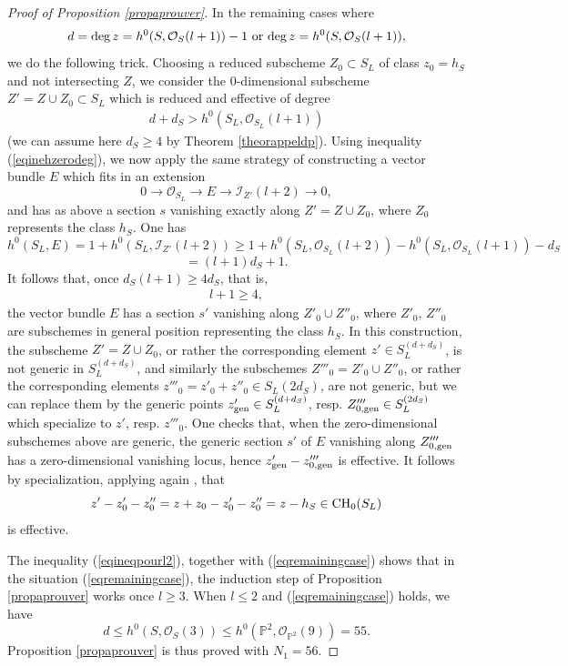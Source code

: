 \documentclass[10pt]{article}
\begin{document}
\begin{proof}[Proof of Proposition \ref{propaprouver}]
 In the remaining cases where
\begin{eqnarray}\label{eqremainingcase}  d={\rm deg}\,z= h^0(S,\mathcal{O}_S(l+1))-1\,\, {\rm or}\,\,{\rm deg}\,z= h^0(S,\mathcal{O}_S(l+1)),\end{eqnarray}
  we do the following trick.  Choosing a  reduced subscheme $Z_0\subset S_L$ of class $z_0=h_S$ and not intersecting $Z$, we consider the $0$-dimensional subscheme  $Z'=Z\cup Z_0\subset S_L$ which is reduced  and effective of  degree \begin{eqnarray}\label{eqinehzerodeg}d+d_S>h^0(S_L,\mathcal{O}_{S_L}(l+1))\end{eqnarray}  (we can assume here $d_S\geq 4$ by Theorem \ref{theorappeldp}).
  Using  inequality (\ref{eqinehzerodeg}), we now apply the same strategy of constructing a vector bundle $E$ which fits in an extension
  $$0\rightarrow \mathcal{O}_{S_L}\rightarrow E\rightarrow \mathcal{I}_{Z'}(l+2)\rightarrow 0,$$
  and has as above a section $s$ vanishing exactly along $Z'=Z\cup Z_0$, where $Z_0$ represents the class $h_S$.
  One has $$h^0(S_L,E)=1+h^0(S_L,\mathcal{I}_{Z'}(l+2))
  \geq 1+h^0(S_L,\mathcal{O}_{S_L}(l+2))-h^0(S_L,\mathcal{O}_{S_L}(l+1))-d_S$$
  $$= (l+1)d_S+1.$$
  It follows that,  once $d_S(l+1)\geq 4d_S$, that is,
  \begin{eqnarray}
  \label{eqineqpourl2} l+1\geq 4,
  \end{eqnarray}
  the vector bundle $E$ has a section $s'$   vanishing along $Z'_0\cup Z''_0$, where $Z'_0,\, Z''_0$ are subschemes in general position representing the class $h_S$.  In this construction, the subscheme $Z'=Z\cup Z_0$, or rather the corresponding  element
   $z'\in S_L^{(d+d_S)}$, is not generic in $S_L^{(d+d_S)}$, and similarly the subschemes $Z'''_0=Z'_0\cup Z''_0$, or rather the corresponding elements $z'''_0=z'_0+z''_0\in S_L{(2d_S)}$, are not generic, but we can replace them by the generic points $z'_{\rm gen}\in S_L^{(d+d_S)}$, resp. $Z'''_{0,{\rm gen}}\in  S_L^{(2d_S)}$ which specialize to $z'$, resp. $z'''_0$.
     One checks that, when the zero-dimensional subschemes above are generic, the generic section $s'$ of $E$ vanishing along  $Z'''_{0,{\rm gen}}$ has a zero-dimensional vanishing locus, hence  $z'_{\rm gen}-z'''_{0,{\rm gen}}$ is effective. It follows by specialization, applying again \cite[Lemme 2.10]{colliot},    that
   $$z'-z'_0-z''_0=z+z_0-z'_0-z''_0=z-h_S\in {\rm CH}_0(S_{L})$$ is effective.

  The inequality (\ref{eqineqpourl2}), together with (\ref{eqremainingcase}) shows that in the situation (\ref{eqremainingcase}), the induction step of Proposition \ref{propaprouver} works once $l\geq 3$. When $l\leq 2$ and (\ref{eqremainingcase}) holds, we have
  $$d\leq h^0(S,\mathcal{O}_S(3))\leq h^0(\mathbb{P}^2,\mathcal{O}_{\mathbb{P}^2}(9))=55.$$
  Proposition \ref{propaprouver} is thus proved with $N_1=56$.
\end{proof}
\end{document}
